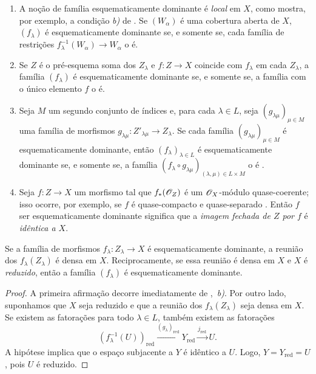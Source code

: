 \begin{remarks}[11.10.3]
\label{IV.11.10.3}
\begin{enumerate}[label=(\roman*)]
\item A noção de família
esquematicamente
dominante é
\emph{local} em $X$,
como mostra, por
exemplo, a condição
\emph{b)} de
.
Se $(W_\alpha)$
é uma cobertura
aberta de $X$,
$(f_\lambda)$ é
esquematicamente
dominante se, e
somente se, cada
família de restrições
$f_\lambda^{-1}
(W_\alpha)\to
W_\alpha$ o é.
\item Se $Z$ é o
pré-esquema soma dos
$Z_\lambda$ e
$f:Z\to X$ coincide
com $f_\lambda$
em cada
$Z_\lambda$, a
família
$(f_\lambda)$ é
esquematicamente
dominante se, e
somente se, a
família com o único
elemento $f$ o é.
\item Seja $M$ um
segundo conjunto
de índices e,
para cada
$\lambda\in L$,
seja
$(g_{\lambda\mu})
_{\mu\in M}$
uma família de
morfismos
$g_{\lambda\mu}:
Z'_{\lambda\mu}
\to Z_\lambda$.
Se cada família
$(g_{\lambda\mu})
_{\mu\in M}$ é
esquematicamente
dominante, então
$(f_\lambda)
_{\lambda\in L}$
é esquematicamente
dominante se, e
somente se, a família
$(f_\lambda\circ
g_{\lambda\mu})
_{(\lambda,\mu)
\in L\times M}$
o é
.
\item Seja
$f:Z\to X$ um
morfismo tal que
$f_*(\mathscr{O}_Z)$
é um
$\mathscr{O}_X$-módulo
quase-coerente;
isso ocorre, por
exemplo, se $f$
é quase-compacto e
quase-separado
.
Então $f$ ser
esquematicamente
dominante significa
que a
\emph{imagem fechada
de $Z$ por $f$}
é \emph{idêntica
a $X$}.
\end{enumerate}
\end{remarks}

\begin{proposition}[11.10.4]
\label{IV.11.10.4}
Se a família de
morfismos
$f_\lambda:
Z_\lambda\to X$
é esquematicamente
dominante, a reunião
dos
$f_\lambda(Z_\lambda)$
é densa em $X$.
Reciprocamente,
se essa reunião é
densa em $X$ e
$X$ é
\emph{reduzido},
então a família
$(f_\lambda)$ é
esquematicamente
dominante.
\end{proposition}

\begin{proof}
A primeira afirmação
decorre imediatamente
de
,~\emph{b)}.
Por outro lado,
suponhamos que $X$
seja reduzido e
que a reunião dos
$f_\lambda(Z_\lambda)$
seja densa em $X$.
Se existem as
fatorações
para todo
$\lambda\in L$,
também existem
as fatorações
\[
(f_\lambda^{-1}(U))
_{\mathrm{red}}
\xrightarrow{(g_\lambda)
_{\mathrm{red}}}
Y_{\mathrm{red}}
\xrightarrow{j_{\mathrm{red}}}
U.
\]
A hipótese implica
que o espaço
subjacente a $Y$
é idêntico a $U$.
Logo,
$Y=Y_{\mathrm{red}}
=U$, pois $U$
é reduzido.
\end{proof}

